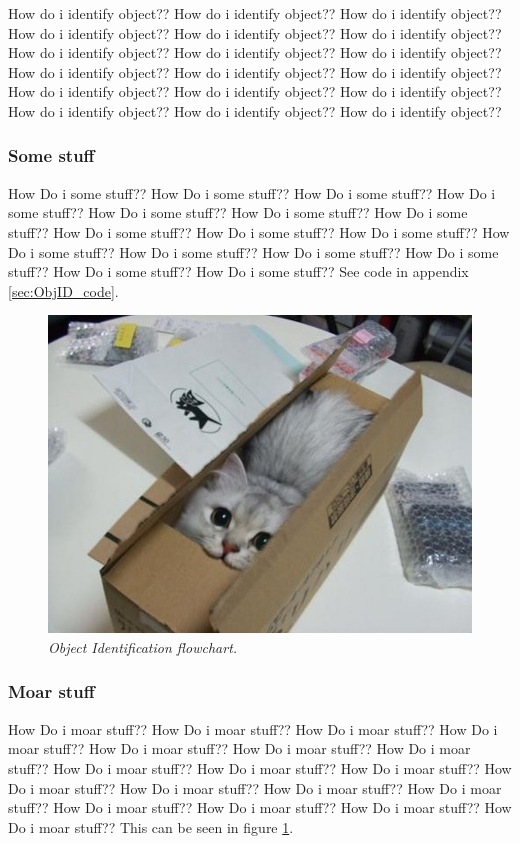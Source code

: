 How do i identify object?? How do i identify object?? How do i identify object?? How do i identify object?? How do i identify object?? How do i identify object?? How do i identify object?? How do i identify object?? How do i identify object?? How do i identify object?? How do i identify object?? How do i identify object?? How do i identify object?? How do i identify object?? How do i identify object?? How do i identify object?? How do i identify object?? How do i identify object??  

\subsubsection{Some stuff}
How Do i some stuff?? How Do i some stuff?? How Do i some stuff?? How Do i some stuff?? How Do i some stuff?? How Do i some stuff?? How Do i some stuff?? How Do i some stuff?? How Do i some stuff?? How Do i some stuff?? How Do i some stuff?? How Do i some stuff?? How Do i some stuff?? How Do i some stuff?? How Do i some stuff?? How Do i some stuff?? 
See code in appendix \ref{sec:ObjID_code}. %

\begin{figure}[htb]
	\centering
	\includegraphics[width=\linewidth]{images/acatisfinetoo}
	\caption{\textit{Object Identification flowchart.}}
	\label{fig:ObjID_fig} %
\end{figure}

\subsubsection{Moar stuff}
How Do i moar stuff?? How Do i moar stuff?? How Do i moar stuff?? How Do i moar stuff?? How Do i moar stuff?? How Do i moar stuff?? How Do i moar stuff?? How Do i moar stuff?? How Do i moar stuff?? How Do i moar stuff?? How Do i moar stuff?? How Do i moar stuff?? How Do i moar stuff?? How Do i moar stuff?? How Do i moar stuff?? How Do i moar stuff?? How Do i moar stuff?? How Do i moar stuff??  
This can be seen in figure \ref{fig:ObjID_fig}. %